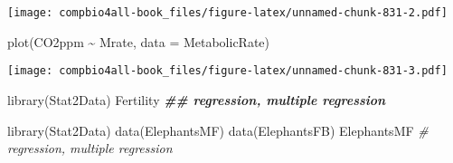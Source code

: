 \documentclass[
]{book}
\newenvironment{Shaded}{\begin{snugshade}}{\end{snugshade}}
\newcommand{\AttributeTok}[1]{\textcolor[rgb]{0.77,0.63,0.00}{#1}}
\newcommand{\CommentTok}[1]{\textcolor[rgb]{0.56,0.35,0.01}{\textit{#1}}}
\newcommand{\DocumentationTok}[1]{\textcolor[rgb]{0.56,0.35,0.01}{\textbf{\textit{#1}}}}
\newcommand{\FunctionTok}[1]{\textcolor[rgb]{0.00,0.00,0.00}{#1}}
\newcommand{\NormalTok}[1]{#1}
\newcommand{\SpecialCharTok}[1]{\textcolor[rgb]{0.00,0.00,0.00}{#1}}
\begin{document}
\texttt{[image: compbio4all-book\_files/figure-latex/unnamed-chunk-831-2.pdf]}

\begin{Shaded}
\begin{Highlighting}[]
\FunctionTok{plot}\NormalTok{(CO2ppm }\SpecialCharTok{\textasciitilde{}}\NormalTok{ Mrate, }\AttributeTok{data =}\NormalTok{ MetabolicRate)}
\end{Highlighting}
\end{Shaded}

\texttt{[image: compbio4all-book\_files/figure-latex/unnamed-chunk-831-3.pdf]}

\begin{Shaded}
\begin{Highlighting}[]
\FunctionTok{library}\NormalTok{(Stat2Data)}
\NormalTok{Fertility }\DocumentationTok{\#\# regression, multiple regression}
\end{Highlighting}
\end{Shaded}

\begin{Shaded}
\begin{Highlighting}[]
\FunctionTok{library}\NormalTok{(Stat2Data)}
\FunctionTok{data}\NormalTok{(ElephantsMF)}
\FunctionTok{data}\NormalTok{(ElephantsFB)}
\NormalTok{ElephantsMF }\CommentTok{\# regression, multiple regression}
\end{Highlighting}
\end{Shaded}
\end{document}
